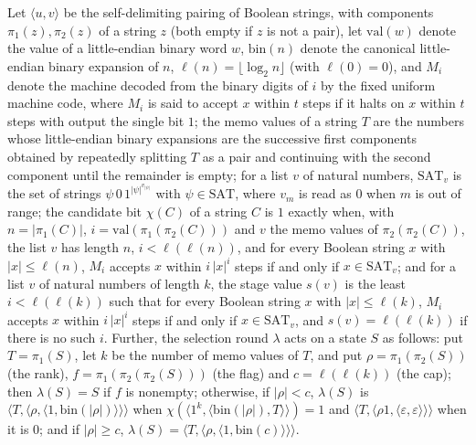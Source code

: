 \begin{theorem}
\label{Complexity.ladner_select_orbit}
\leanok
{}
Let $\langle u,v\rangle$ be the self-delimiting pairing of Boolean strings, with components $\pi_1(z),\pi_2(z)$ of a string $z$ (both empty if $z$ is not a pair), let $\mathrm{val}(w)$ denote the value of a little-endian binary word $w$, $\mathrm{bin}(n)$ denote the canonical little-endian binary expansion of $n$, $\ell(n)=\lfloor\log_2 n\rfloor$ (with $\ell(0)=0$), and $M_i$ denote the machine decoded from the binary digits of $i$ by the fixed uniform machine code, where $M_i$ is said to accept $x$ within $t$ steps if it halts on $x$ within $t$ steps with output the single bit $1$; the memo values of a string $T$ are the numbers whose little-endian binary expansions are the successive first components obtained by repeatedly splitting $T$ as a pair and continuing with the second component until the remainder is empty; for a list $v$ of natural numbers, $\mathrm{SAT}_v$ is the set of strings $\psi\,0\,1^{|\psi|^{v_{|\psi|}}}$ with $\psi\in\mathrm{SAT}$, where $v_m$ is read as $0$ when $m$ is out of range; the candidate bit $\chi(C)$ of a string $C$ is $1$ exactly when, with $n=|\pi_1(C)|$, $i=\mathrm{val}(\pi_1(\pi_2(C)))$ and $v$ the memo values of $\pi_2(\pi_2(C))$, the list $v$ has length $n$, $i<\ell(\ell(n))$, and for every Boolean string $x$ with $|x|\le\ell(n)$, $M_i$ accepts $x$ within $i\,|x|^i$ steps if and only if $x\in\mathrm{SAT}_v$; and for a list $v$ of natural numbers of length $k$, the stage value $s(v)$ is the least $i<\ell(\ell(k))$ such that for every Boolean string $x$ with $|x|\le\ell(k)$, $M_i$ accepts $x$ within $i\,|x|^i$ steps if and only if $x\in\mathrm{SAT}_v$, and $s(v)=\ell(\ell(k))$ if there is no such $i$. Further, the selection round $\lambda$ acts on a state $S$ as follows: put $T=\pi_1(S)$, let $k$ be the number of memo values of $T$, and put $\rho=\pi_1(\pi_2(S))$ (the rank), $f=\pi_1(\pi_2(\pi_2(S)))$ (the flag) and $c=\ell(\ell(k))$ (the cap); then $\lambda(S)=S$ if $f$ is nonempty; otherwise, if $|\rho|<c$, $\lambda(S)$ is $\langle T,\langle\rho,\langle 1,\mathrm{bin}(|\rho|)\rangle\rangle\rangle$ when $\chi(\langle 1^{k},\langle\mathrm{bin}(|\rho|),T\rangle\rangle)=1$ and $\langle T,\langle\rho1,\langle\varepsilon,\varepsilon\rangle\rangle\rangle$ when it is $0$; and if $|\rho|\ge c$, $\lambda(S)=\langle T,\langle\rho,\langle 1,\mathrm{bin}(c)\rangle\rangle\rangle$.

\end{theorem}
